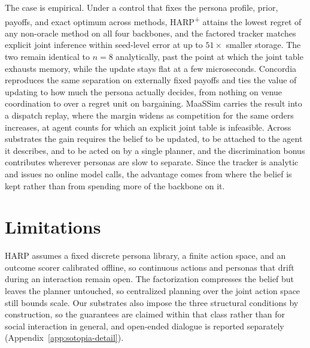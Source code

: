 \documentclass[letterpaper]{article} %
\begin{document}
The case is empirical. Under a control that fixes the persona profile, prior, payoffs, and exact optimum across methods, HARP\textsuperscript{+} attains the lowest regret of any non-oracle method on all four backbones, and the factored tracker matches explicit joint inference within seed-level error at up to $51\times$ smaller storage. The two remain identical to $n{=}8$ analytically, past the point at which the joint table exhausts memory, while the update stays flat at a few microseconds. Concordia reproduces the same separation on externally fixed payoffs and ties the value of updating to how much the persona actually decides, from nothing on venue coordination to over a regret unit on bargaining. MaaSSim carries the result into a dispatch replay, where the margin widens as competition for the same orders increases, at agent counts for which an explicit joint table is infeasible. Across substrates the gain requires the belief to be updated, to be attached to the agent it describes, and to be acted on by a single planner, and the discrimination bonus contributes wherever personas are slow to separate. Since the tracker is analytic and issues no online model calls, the advantage comes from where the belief is kept rather than from spending more of the backbone on it.

\section*{Limitations}
HARP assumes a fixed discrete persona library, a finite action space, and an outcome scorer calibrated offline, so continuous actions and personas that drift during an interaction remain open. The factorization compresses the belief but leaves the planner untouched, so centralized planning over the joint action space still bounds scale. Our substrates also impose the three structural conditions by construction, so the guarantees are claimed within that class rather than for social interaction in general, and open-ended dialogue is reported separately (Appendix~\ref{app:sotopia-detail}).



\clearpage %

\end{document}

